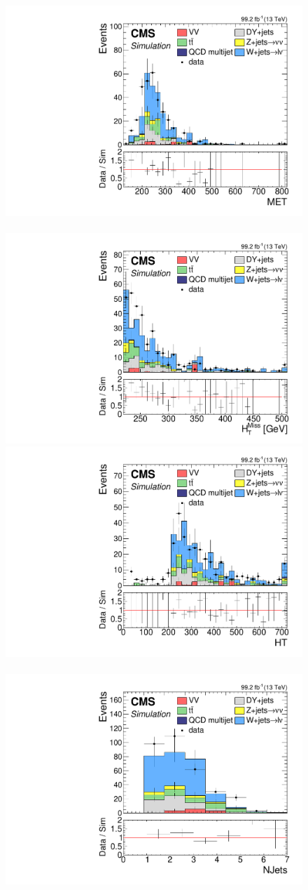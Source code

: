 \begin{figure}[!htb]
\centering
\includegraphics[width=0.48\linewidth]{plots/dilepton_muons_data_control_region_phase1/none_MET.pdf} \,
\includegraphics[width=0.48\linewidth]{plots/dilepton_muons_data_control_region_phase1/none_MHT.pdf} \\

\includegraphics[width=0.48\linewidth]{plots/dilepton_muons_data_control_region_phase1/none_HT.pdf} \,
\includegraphics[width=0.48\linewidth]{plots/dilepton_muons_data_control_region_phase1/none_NJets.pdf} \\


\end{figure}
